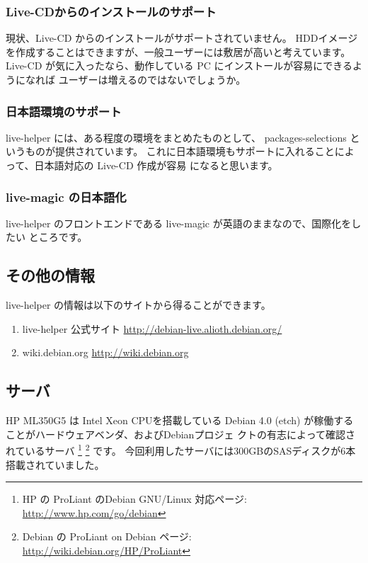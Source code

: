 \documentclass[mingoth,a4paper]{jsarticle}
\begin{document}
\subsubsection{Live-CDからのインストールのサポート}
現状、Live-CD からのインストールがサポートされていません。
HDDイメージを作成することはできますが、一般ユーザーには敷居が高いと考えています。
Live-CD が気に入ったなら、動作している PC にインストールが容易にできるようになれば
ユーザーは増えるのではないでしょうか。

\subsubsection{日本語環境のサポート}
live-helper には、ある程度の環境をまとめたものとして、
packages-selections というものが提供されています。
これに日本語環境もサポートに入れることによって、日本語対応の Live-CD 作成が容易
になると思います。

\subsubsection{live-magic の日本語化}
live-helper のフロントエンドである live-magic が英語のままなので、国際化をしたい
ところです。


\subsection{その他の情報}
live-helper の情報は以下のサイトから得ることができます。
\begin{enumerate}
\item live-helper 公式サイト \url{http://debian-live.alioth.debian.org/}
\item wiki.debian.org \url{http://wiki.debian.org}

\end{enumerate}

\label{ml350g5}

\subsection{サーバ}

HP ML350G5 は Intel Xeon CPUを搭載している
Debian 4.0 (etch) が稼働することがハードウェアベンダ、およびDebianプロジェ
クトの有志によって確認されているサーバ
\footnote{HP の ProLiant のDebian GNU/Linux 対応ページ:
\url{http://www.hp.com/go/debian}}
\footnote{Debian の ProLiant on Debian ページ:
\url{http://wiki.debian.org/HP/ProLiant}}
です。
今回利用したサーバには300GBのSASディスクが6本搭載されていました。
\end{document}
